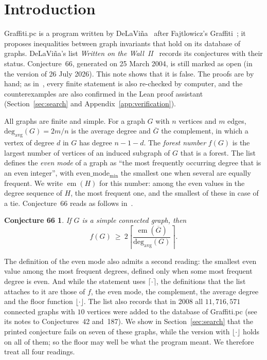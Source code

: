 \documentclass[10pt,a4paper]{article}
\newtheorem*{conjsixtysix}{Conjecture 66}
\newcommand{\davg}{\operatorname{deg_{avg}}}
\newcommand{\emo}{\operatorname{em}}
\newcommand{\Gb}{\overline{G}}
\begin{document}
\baselineskip=0.20in



\section{Introduction}

Graffiti.pc is a program written by DeLaVi\~na~\cite{DeLaVina2005} after Fajtlowicz's Graffiti~\cite{Fajtlowicz1988}; it proposes inequalities between graph invariants that hold on its database of graphs. DeLaVi\~na's list \emph{Written on the Wall~II}~\cite{WOWII} records its conjectures with their status. Conjecture~66, generated on 25 March 2004, is still marked as open (in the version of 26 July 2026). This note shows that it is false. The proofs are by hand; as in~\cite{BMB2026}, every finite statement is also re-checked by computer, and the counterexamples are also confirmed in the Lean proof assistant (Section~\ref{sec:search} and Appendix~\ref{app:verification}).

All graphs are finite and simple. For a graph $G$ with $n$ vertices and $m$ edges, $\davg(G)=2m/n$ is the average degree and $\Gb$ the complement, in which a vertex of degree $d$ in $G$ has degree $n-1-d$. The \emph{forest number} $f(G)$ is the largest number of vertices of an induced subgraph of $G$ that is a forest. The list defines the \emph{even mode} of a graph as ``the most frequently occurring degree that is an even integer'', with $\mathrm{even\_mode_{min}}$ the smallest one when several are equally frequent. We write $\emo(H)$ for this number: among the even values in the degree sequence of $H$, the most frequent one, and the smallest of these in case of a tie. Conjecture~66 reads as follows in~\cite{WOWII}.

\begin{conjsixtysix}
If $G$ is a simple connected graph, then
\[
f(G)\ \ge\ 2\left\lceil \frac{\emo(\Gb)}{\davg(G)}\right\rceil .
\]
\end{conjsixtysix}

The definition of the even mode also admits a second reading: the smallest even value among the most frequent degrees, defined only when some most frequent degree is even. And while the statement uses $\lceil\cdot\rceil$, the definitions that the list attaches to it are those of $f$, the even mode, the complement, the average degree and the floor function $\lfloor\cdot\rfloor$. The list also records that in 2008 all $11{,}716{,}571$ connected graphs with $10$ vertices were added to the database of Graffiti.pc (see its notes to Conjectures~42 and~187). We show in Section~\ref{sec:search} that the printed conjecture fails on seven of these graphs, while the version with $\lfloor\cdot\rfloor$ holds on all of them; so the floor may well be what the program meant. We therefore treat all four readings.
\end{document}
